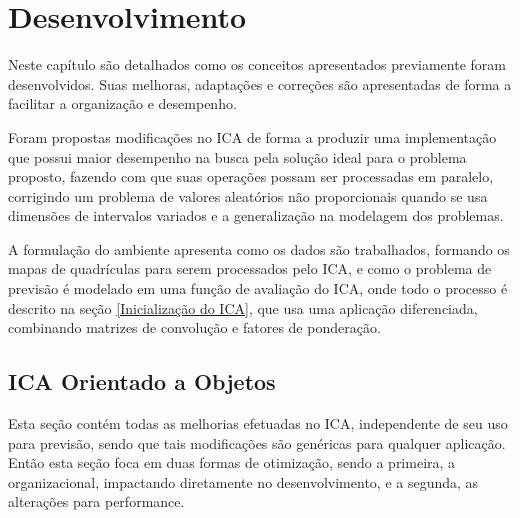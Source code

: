 

\chapter{Desenvolvimento}
\label{Desenvolvimento}


Neste capítulo são detalhados como os conceitos apresentados previamente foram desenvolvidos. Suas melhoras, adaptações e correções são apresentadas de forma a facilitar a organização e desempenho. 

Foram propostas modificações no ICA de forma a produzir uma implementação que possui maior desempenho na busca pela solução ideal para o problema proposto, fazendo com que suas operações possam ser processadas em paralelo, corrigindo um problema de valores aleatórios não proporcionais quando se usa dimensões de intervalos variados e a generalização na modelagem dos problemas.

A formulação do ambiente apresenta como os dados são trabalhados, formando os mapas de quadrículas para serem processados pelo ICA, e como o problema de previsão é modelado em uma função de avaliação do ICA, onde todo o processo é descrito na seção \ref{Inicialização do ICA}, que usa uma aplicação diferenciada, combinando matrizes de convolução e fatores de ponderação.




\section{ICA Orientado a Objetos}
\label{ICA Orientado a Objetos}

Esta seção contém todas as melhorias efetuadas no ICA, independente de seu uso para previsão, sendo que tais modificações são genéricas para qualquer aplicação. Então esta seção foca em duas formas de otimização, sendo a primeira, a organizacional, impactando diretamente no desenvolvimento, e a segunda, as alterações para performance.

